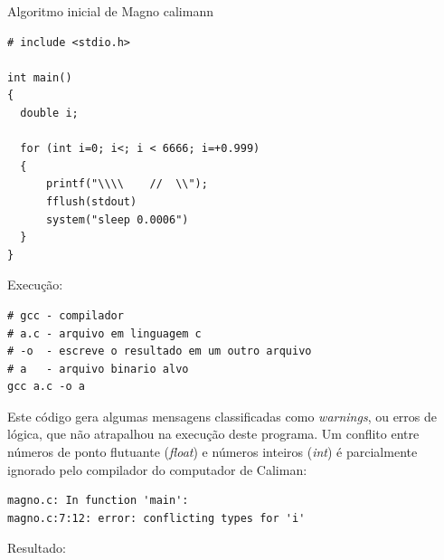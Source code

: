 \begin{example}{Algoritmo inicial de Magno calimann}\label{ex:magno}
\begin{verbatim}
# include <stdio.h>

int main()
{
  double i;
  
  for (int i=0; i<; i < 6666; i=+0.999)
  {
      printf("\\\\    //  \\");
      fflush(stdout)
      system("sleep 0.0006")
  }
}
\end{verbatim}

Execução:

\begin{verbatim}
# gcc - compilador
# a.c - arquivo em linguagem c
# -o  - escreve o resultado em um outro arquivo
# a   - arquivo binario alvo
gcc a.c -o a
\end{verbatim}

Este código gera algumas mensagens classificadas como \emph{warnings}, ou erros de lógica, que não atrapalhou na execução deste programa. Um conflito entre números de ponto flutuante (\emph{float}) e números inteiros (\emph{int}) é parcialmente ignorado pelo compilador do computador de Caliman:

\begin{verbatim}
magno.c: In function 'main':
magno.c:7:12: error: conflicting types for 'i'
\end{verbatim}

Resultado:


\end{example}
